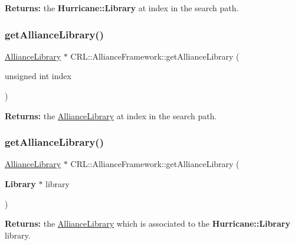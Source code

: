 {\bfseries Returns\+:} the \textbf{ Hurricane\+::\+Library} at {\ttfamily index} in the search path. \mbox{\label{classCRL_1_1AllianceFramework_a4085f3bc96ca5e4bf2d41a4ada9658f2}} 
\subsubsection{\texorpdfstring{get\+Alliance\+Library()}{getAllianceLibrary()}\hspace{0.1cm}{\footnotesize\ttfamily [1/2]}}
{\footnotesize\ttfamily \mbox{\hyperlink{classCRL_1_1AllianceLibrary}{Alliance\+Library}} $\ast$ C\+R\+L\+::\+Alliance\+Framework\+::get\+Alliance\+Library (\begin{DoxyParamCaption}\item[{unsigned int}]{index }\end{DoxyParamCaption})}

{\bfseries Returns\+:} the \mbox{\hyperlink{classCRL_1_1AllianceLibrary}{Alliance\+Library}} at {\ttfamily index} in the search path. \mbox{\label{classCRL_1_1AllianceFramework_a8e007b3f2ac45feec2907f77530a718c}} 
\subsubsection{\texorpdfstring{get\+Alliance\+Library()}{getAllianceLibrary()}\hspace{0.1cm}{\footnotesize\ttfamily [2/2]}}
{\footnotesize\ttfamily \mbox{\hyperlink{classCRL_1_1AllianceLibrary}{Alliance\+Library}} $\ast$ C\+R\+L\+::\+Alliance\+Framework\+::get\+Alliance\+Library (\begin{DoxyParamCaption}\item[{\textbf{ Library} $\ast$}]{library }\end{DoxyParamCaption})}

{\bfseries Returns\+:} the \mbox{\hyperlink{classCRL_1_1AllianceLibrary}{Alliance\+Library}} which is associated to the \textbf{ Hurricane\+::\+Library} {\ttfamily library}. \mbox{\label{classCRL_1_1AllianceFramework_a4efc06e6a6d5413398946453c3fd6649}} 
